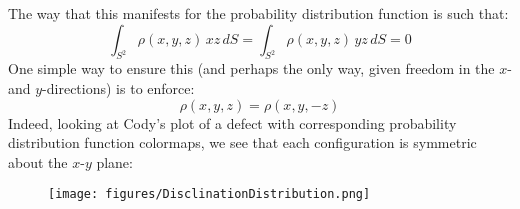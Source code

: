 \documentclass[reqno]{article}
\begin{document}
The way that this manifests for the probability distribution function is such that:
\begin{equation}
    \int_{S^2} \rho(x, y, z) \, xz \, dS
    =
    \int_{S^2} \rho(x, y, z) \, yz \, dS
    =
    0
\end{equation}
One simple way to ensure this (and perhaps the only way, given freedom in the $x$- and $y$-directions) is to enforce:
\begin{equation}
    \rho(x, y, z) = \rho(x, y, -z)
\end{equation}
Indeed, looking at Cody's plot of a defect with corresponding probability distribution function colormaps, we see that each configuration is symmetric about the $x$-$y$ plane:
\begin{figure}[H] 
  \centering 
    \texttt{[image: figures/DisclinationDistribution.png]}
    \label{fig:disclination-distribution}
\end{figure}
\end{document}
